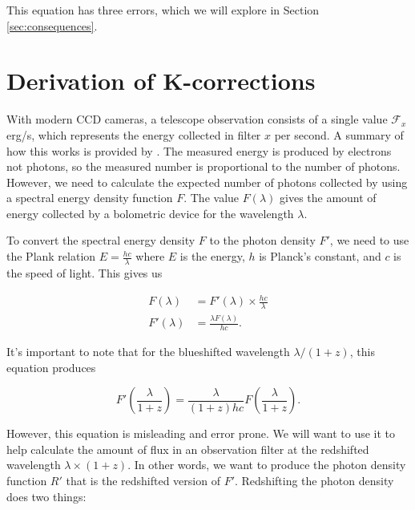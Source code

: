 \documentclass[linenumbers]{aastex631}
\begin{document}
This equation has three errors, which we will explore in Section
\ref{sec:consequences}.

\section{Derivation of K-corrections}
\label{sec:derivation}

With modern CCD cameras, a telescope observation consists of a single value
$\mathcal{F}_x$ erg/s, which represents the energy collected in filter $x$ per
second. A summary of how this works is provided by \citet{lesser2015}. The
measured energy is produced by electrons not photons, so the measured number is
proportional to the number of photons. However, we need to calculate the
expected number of photons collected by using a spectral energy density
function $F$. The value $F(\lambda)$ gives the amount of energy collected by a
bolometric device for the wavelength $\lambda$.

To convert the spectral energy density $F$ to the photon density $F'$, we need
to use the Plank relation $E = \frac{hc}{\lambda}$ where $E$ is the energy, $h$
is Planck's constant, and $c$ is the speed of light. This gives us

\begin{equation}
\begin{aligned}
   F(\lambda) &= F'(\lambda) \times \frac{hc}{\lambda} \\
  F'(\lambda) &= \frac{\lambda F(\lambda)}{hc}.
\end{aligned}
\end{equation}

It's important to note that for the blueshifted wavelength $\lambda / (1+z)$,
this equation produces

\begin{equation}
 F'\left(\frac{\lambda}{1+z}\right) = \frac{\lambda}{(1+z)hc} F\left(\frac{\lambda}{1+z}\right).
\end{equation}

However, this equation is misleading and error prone. We will want to use it to
help calculate the amount of flux in an observation filter at the redshifted
wavelength $\lambda \times (1 + z)$. In other words, we want to produce the
photon density function $R'$ that is the redshifted version of $F'$.
Redshifting the photon density does two things:
\end{document}
